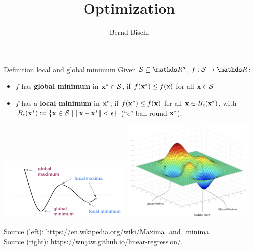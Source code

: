





\newcommand{\titlefigure}{figure_man/local_global_min_2D.png}
\newcommand{\learninggoals}{
\item Local and global
\item First \& second order conditions}



\title{Optimization}
\author{Bernd Bischl}
\date{}



\sloppy

\begin{vbframe}{Definition local and global minimum}
  Given $\mathcal{S} \subseteq \R^d$, $f: \mathcal{S} \to \R$:
  \begin{itemize}
  \item $f$ has \textbf{global minimum} in $\mathbf{x}^\ast \in \mathcal{S}$, if $f(\mathbf{x}^\ast) \leq f(\mathbf{x})$ for all $\mathbf{x} \in \mathcal{S}$
  \item $f$ has a \textbf{local minimum} in $\mathbf{x}^\ast$, if $f(\mathbf{x}^\ast) \leq f(\mathbf{x})$ for all $\mathbf{x} \in B_\epsilon(\mathbf{x}^\ast)$, with $B_\epsilon(\mathbf{x}^\ast) := \{\mathbf{x} \in \mathcal{S} ~|~\|\mathbf{x} - \mathbf{x}^\ast\| < \epsilon\}$ (\enquote{$\epsilon$}-ball round $\mathbf{x}^\ast$).  
  \end{itemize}
  
  \vspace*{-0.3cm}
  
  \begin{center}
  \includegraphics[width = 0.48\textwidth]{figure_man/local_global_min.png} \quad \includegraphics[width = 0.48\textwidth]{figure_man/local_global_min_2D.png} \\
  \vspace*{0.3cm}
  \begin{tiny}
    Source (left): \url{https://en.wikipedia.org/wiki/Maxima_and_minima}. \\ Source (right): \url{https://wngaw.github.io/linear-regression/}. 
  \end{tiny}
  \end{center}
  
  \end{vbframe}
  
